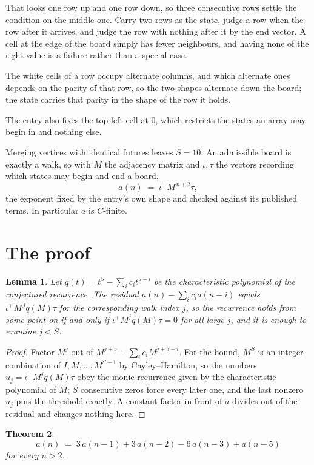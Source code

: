 \documentclass[11pt,a4paper]{article}
\theoremstyle{plain}
\newtheorem{theorem}{Theorem}
\newtheorem{lemma}[theorem]{Lemma}
\theoremstyle{definition}
\begin{document}
That looks one row up and one row down, so three consecutive rows settle the condition on the middle one. Carry two rows as the state, judge a row when the row after it arrives, and judge the row with nothing after it by the end vector. A cell at the edge of the board simply has fewer neighbours, and having none of the right value is a failure rather than a special case.

The white cells of a row occupy alternate columns, and which alternate ones depends on the parity of that row, so the two shapes alternate down the board; the state carries that parity in the shape of the row it holds.

The entry also fixes the top left cell at $0$, which restricts the states an array may begin in and nothing else.

Merging vertices with identical futures leaves $S=10$. An admissible board is exactly a walk, so with $M$ the adjacency matrix and $\iota,\tau$ the vectors recording which states may begin and end a board,
\[
a(n)\;=\;\iota^{\!\top}M^{\,n+2}\tau ,
\]
the exponent fixed by the entry's own shape and checked against its published terms. In
particular $a$ is $C$-finite.

\section{The proof}

\begin{lemma}\label{lem:crit}
Let $q(t)=t^{5}-\sum_i c_it^{5-i}$ be the characteristic polynomial of the
conjectured recurrence. The residual $a(n)-\sum_ic_ia(n-i)$ equals
$\iota^{\!\top}M^{\,j}q(M)\tau$ for the corresponding walk index $j$, so the recurrence
holds from some point on if and only if $\iota^{\!\top}M^{j}q(M)\tau=0$ for all large $j$,
and it is enough to examine $j<S$.
\end{lemma}

\begin{proof}
Factor $M^{j}$ out of $M^{j+5}-\sum_ic_iM^{j+5-i}$. For the bound, $M^{S}$
is an integer combination of $I,M,\dots,M^{S-1}$ by Cayley--Hamilton, so the numbers
$u_j=\iota^{\!\top}M^{j}q(M)\tau$ obey the monic recurrence given by the characteristic
polynomial of $M$; $S$ consecutive zeros force every later one, and the last nonzero $u_j$
pins the threshold exactly. A constant factor in front of $a$ divides out of the residual and
changes nothing here.
\end{proof}

\begin{theorem}
\[
a(n)\;=\;3\,a(n-1) + 3\,a(n-2) - 6\,a(n-3) + a(n-5)
\]
for every $n>2$.
\end{theorem}
\end{document}

